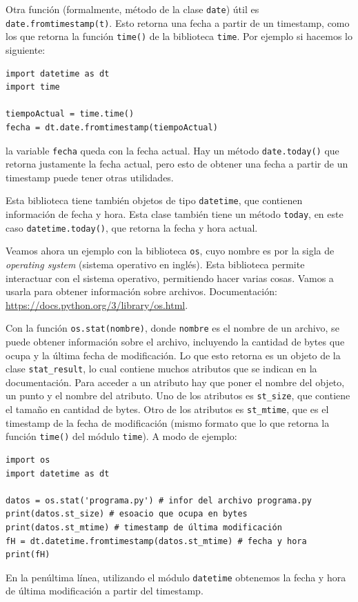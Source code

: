 \documentclass[a4paper, 12pt]{report}
\theoremstyle{definition}
\begin{document}
Otra función (formalmente, método de la clase {\tt date}) útil es {\tt date.fromtimestamp(t)}. Esto retorna una fecha a partir de un timestamp, como los que retorna la función {\tt time()} de la biblioteca {\tt time}. Por ejemplo si hacemos lo siguiente:
\begin{verbatim}
import datetime as dt
import time

tiempoActual = time.time()
fecha = dt.date.fromtimestamp(tiempoActual)
\end{verbatim}
la variable {\tt fecha} queda con la fecha actual. Hay un método {\tt date.today()} que retorna justamente la fecha actual, pero esto de obtener una fecha a partir de un timestamp puede tener otras utilidades.

Esta biblioteca tiene también objetos de tipo {\tt datetime}, que contienen información de fecha y hora. Esta clase también tiene un método {\tt today}, en este caso {\tt datetime.today()}, que retorna la fecha y hora actual.

\vspace{1em}
Veamos ahora un ejemplo con la biblioteca {\tt os}, cuyo nombre es por la sigla de {\sl operating system} (sistema operativo en inglés). Esta biblioteca permite interactuar con el sistema operativo, permitiendo hacer varias cosas. Vamos a usarla para obtener información sobre archivos. Documentación: \href{https://docs.python.org/3/library/os.html}{https://docs.python.org/3/library/os.html}.

Con la función {\tt os.stat(nombre)}, donde {\tt nombre} es el nombre de un archivo, se puede obtener información sobre el archivo, incluyendo la cantidad de bytes que ocupa y la última fecha de modificación. Lo que esto retorna es un objeto de la clase {\tt stat\_result}, lo cual contiene muchos atributos que se indican en la documentación. Para acceder a un atributo hay que poner el nombre del objeto, un punto y el nombre del atributo. Uno de los atributos es {\tt st\_size}, que contiene el tamaño en cantidad de bytes. Otro de los atributos es {\tt st\_mtime}, que es el timestamp de la fecha de modificación (mismo formato que lo que retorna la función {\tt time()} del módulo {\tt time}). A modo de ejemplo:
\begin{verbatim}
import os
import datetime as dt

datos = os.stat('programa.py') # infor del archivo programa.py
print(datos.st_size) # esoacio que ocupa en bytes
print(datos.st_mtime) # timestamp de última modificación
fH = dt.datetime.fromtimestamp(datos.st_mtime) # fecha y hora
print(fH) 
\end{verbatim}
En la penúltima línea, utilizando el módulo {\tt datetime} obtenemos la fecha y hora de última modificación a partir del timestamp.
\end{document}
